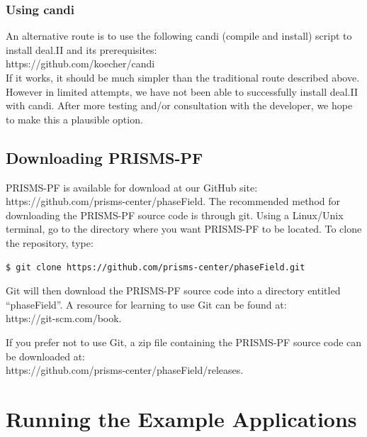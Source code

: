 \documentclass[10pt]{article} %
\begin{document}
\subsubsection{Using candi}
An alternative route is to use the following candi (compile and install) script to install deal.II and its prerequisites: \\
https://github.com/koecher/candi \\

If it works, it should be much simpler than the traditional route described above. However in limited attempts, we have not been able to successfully install deal.II with candi. After more testing and/or consultation with the developer, we hope to make this a plausible option.

\subsection{Downloading PRISMS-PF}
PRISMS-PF is available for download at our GitHub site: https://github.com/prisms-center/phaseField. The recommended method for downloading the PRISMS-PF source code is through git. Using a Linux/Unix terminal, go to the directory where you want PRISMS-PF to be located. To clone the repository, type:
\begin{lstlisting}
$ git clone https://github.com/prisms-center/phaseField.git
\end{lstlisting}
Git will then download the PRISMS-PF source code into a directory entitled ``phaseField''. A resource for learning to use Git can be found at: \\https://git-scm.com/book.

If you prefer not to use Git, a zip file containing the PRISMS-PF source code can be downloaded at: \\https://github.com/prisms-center/phaseField/releases.

\section{Running the Example Applications} \label{running_examples}
\end{document}
